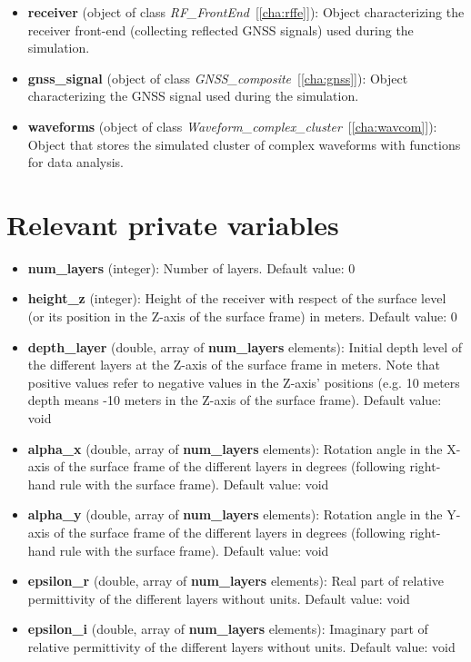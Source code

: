\begin{itemize}
\item {\bf receiver} (object of class {\it RF\_FrontEnd}~[\ref{cha:rffe}]): Object characterizing the receiver front-end (collecting reflected GNSS signals) used during the simulation.

\item {\bf gnss\_signal} (object of class {\it GNSS\_composite}~[\ref{cha:gnss}]): Object characterizing the GNSS signal used during the simulation.

\item {\bf waveforms} (object of class {\it Waveform\_complex\_cluster}~[\ref{cha:wavcom}]): Object that stores the simulated cluster of complex waveforms with functions for data analysis.
\end{itemize}


\section{Relevant private variables}

\begin{itemize} 
\item {\bf num\_layers} (integer): Number of layers. Default value: 0

\item {\bf height\_z} (integer): Height of the receiver with respect of the surface level (or its position in the Z-axis of the surface frame) in meters. Default value: 0

\item {\bf depth\_layer} (double, array of {\bf num\_layers} elements): Initial depth level of the different layers at the Z-axis of the surface frame in meters. Note that positive values refer to negative values in the Z-axis' positions (e.g. 10 meters depth means -10 meters in the Z-axis of the surface frame). Default value: void

\item {\bf alpha\_x} (double, array of {\bf num\_layers} elements): Rotation angle in the X-axis of the surface frame of the different layers in degrees (following right-hand rule with the surface frame). Default value: void

\item {\bf alpha\_y} (double, array of {\bf num\_layers} elements): Rotation angle in the Y-axis of the surface frame of the different layers in degrees (following right-hand rule with the surface frame). Default value: void

\item {\bf epsilon\_r} (double, array of {\bf num\_layers} elements): Real part of relative permittivity of the different layers without units. Default value: void

\item {\bf epsilon\_i} (double, array of {\bf num\_layers} elements): Imaginary part of relative permittivity of the different layers without units. Default value: void
\end{itemize}


